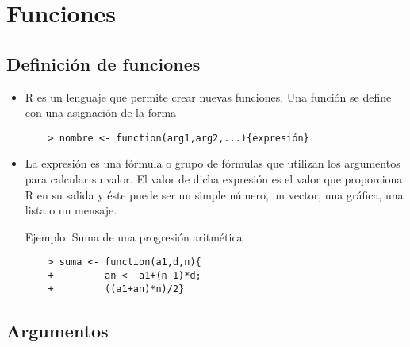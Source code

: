 \section{Funciones}

\subsection{Definición de funciones}

\begin{itemize}
    \item R es un lenguaje que permite crear nuevas funciones.
    Una función se define con una asignación de la forma
    \begin{verbatim}
    > nombre <- function(arg1,arg2,...){expresión}
    \end{verbatim}

    \item La expresión es una fórmula o grupo de fórmulas
    que utilizan los argumentos para calcular su valor.
    El valor de dicha expresión es el valor que proporciona
    R en su salida y éste puede ser un simple número, un vector,
    una gráfica, una lista o un mensaje.

    Ejemplo: Suma de una progresión aritmética
    \begin{verbatim}
    > suma <- function(a1,d,n){
    +         an <- a1+(n-1)*d;
    +         ((a1+an)*n)/2}
    \end{verbatim}
\end{itemize}

\newslide

\subsection{Argumentos}

